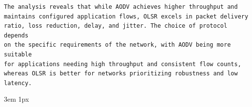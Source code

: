 \documentclass{Academic}
\begin{document}
\begin{lstlisting}[caption={Excerpt from the report-ready AI summary}]
The analysis reveals that while AODV achieves higher throughput and
maintains configured application flows, OLSR excels in packet delivery
ratio, loss reduction, delay, and jitter. The choice of protocol depends
on the specific requirements of the network, with AODV being more suitable
for applications needing high throughput and consistent flow counts,
whereas OLSR is better for networks prioritizing robustness and low latency.
\end{lstlisting}

\newpage
\singlespacing
\emergencystretch 3em
\hfuzz 1px
\printbibliography[heading=bibnumbered, env=bibliography]


\end{document}
